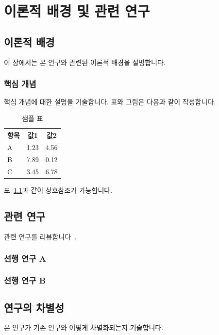 \chapter{이론적 배경 및 관련 연구}
\label{ch:background}

\section{이론적 배경}

이 장에서는 본 연구와 관련된 이론적 배경을 설명합니다.

\subsection{핵심 개념}

핵심 개념에 대한 설명을 기술합니다. 표와 그림은 다음과 같이 작성합니다.

\begin{table}[h]
  \centering
  \caption{샘플 표}
  \label{tab:sample}
  \begin{tabular}{lcc}
    \toprule
    항목 & 값1 & 값2 \\
    \midrule
    A & 1.23 & 4.56 \\
    B & 7.89 & 0.12 \\
    C & 3.45 & 6.78 \\
    \bottomrule
  \end{tabular}
\end{table}

표~\ref{tab:sample}과 같이 상호참조가 가능합니다.

\section{관련 연구}

관련 연구를 리뷰합니다~\cite{sample2026}.

\subsection{선행 연구 A}

\subsection{선행 연구 B}

\section{연구의 차별성}

본 연구가 기존 연구와 어떻게 차별화되는지 기술합니다.
